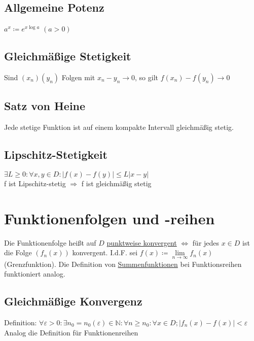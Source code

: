 \documentclass{article}
\begin{document}
\subsection{Allgemeine Potenz}
$a^x \coloneqq e^{x \log a}$ \hspace{2em} $(a > 0)$

\subsection{Gleichmäßige Stetigkeit}
Sind $(x_n)(y_n)$ Folgen mit $x_n - y_n \to 0$, so gilt $f(x_n)-f(y_n) \to 0$

\subsection{Satz von Heine}
Jede stetige Funktion ist auf einem kompakte Intervall gleichmäßig stetig.

\subsection{Lipschitz-Stetigkeit}
$\exists L \geq 0: \forall x,y \in D: |f(x)-f(y)| \leq L|x-y|$ \\
f ist Lipschitz-stetig $\Rightarrow$ f ist gleichmäßig stetig

\section{Funktionenfolgen und -reihen}
Die Funktionenfolge heißt auf $D$ \underline{punktweise konvergent} $\Leftrightarrow$ für jedes $x \in D$ ist die Folge $(f_n(x))$ konvergent.
I.d.F. sei $f(x) \coloneqq \lim \limits_{n \to \infty} f_n(x)$ (Grenzfunktion). 
Die Definition von \underline{Summenfunktionen} bei Funktionsreihen funktioniert analog.

\subsection{Gleichmäßige Konvergenz}
Definition: $\forall \varepsilon > 0: \exists n_0=n_0(\varepsilon) \in \mathbb{N}: \forall n \geq n_0: \forall x \in D; |f_n(x) - f(x)| < \varepsilon$ \\
Analog die Definition für Funktionenreihen
\end{document}
